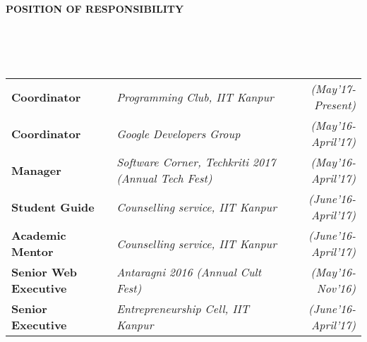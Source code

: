 \documentclass[a4paper,10pt]{article}
\newcommand{\lsep}{-0.5cm}
\newcommand{\resheading}[1]{{\small \colorbox{mygrey}{\begin{minipage}{0.975\textwidth}{\textbf{#1 \vphantom{p\^{E}}}}\end{minipage}}}}
\begin{document}
\resheading{\textbf{POSITION OF RESPONSIBILITY} }\\[\lsep]
\\ \\ \indent
\begin{tabular}{l @{\hskip 0.5in}l @{\hskip 0.3in}r }
\textbf{Coordinator} & \textit{Programming Club, IIT Kanpur} & \emph{(May'17-Present)}\\
\textbf{Coordinator} & \textit{Google Developers Group} &
\emph{(May'16-April'17)}\\
\textbf{Manager} & \textit{Software Corner, Techkriti 2017 (Annual Tech Fest)} &
\emph{(May'16-April'17)}\\
\textbf{Student Guide} & \textit{Counselling service, IIT Kanpur} & \emph{(June'16-April'17)}\\
\textbf{Academic Mentor} & \textit{Counselling service, IIT Kanpur} & \emph{(June'16-April'17)}\\
\textbf{Senior Web Executive} & \textit{Antaragni 2016 (Annual Cult Fest)} & \emph{(May'16-Nov'16)}\\
\textbf{Senior Executive} & \textit{Entrepreneurship Cell, IIT Kanpur} & \emph{(June'16-April'17)}\\
\end{tabular}
\end{document}
